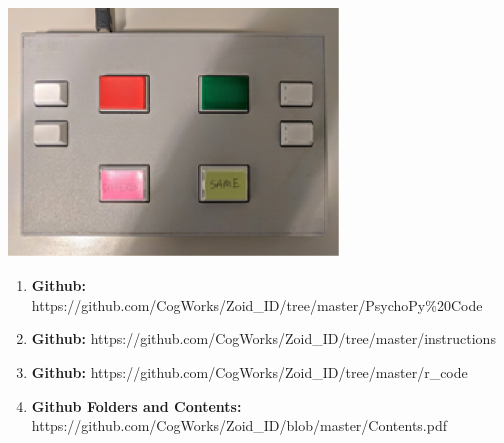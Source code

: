 \documentclass{article}
\begin{document}
	\noindent \textbf{\includegraphics*[width=3.46in, height=2.60in, keepaspectratio=false]{image25}}
	
	\begin{enumerate}
		\item \textbf{ Github: }https://github.com/CogWorks/Zoid\_ID/tree/master/PsychoPy\%20Code \textbf{ }
		
		\item \textbf{ Github: }https://github.com/CogWorks/Zoid\_ID/tree/master/instructions \textbf{ }
		
		\item \textbf{ Github: }https://github.com/CogWorks/Zoid\_ID/tree/master/r\_code \textbf{}
		
		\item \textbf{ Github Folders and Contents: }https://github.com/CogWorks/Zoid\_ID/blob/master/Contents.pdf\textbf{ }
	\end{enumerate}
	
	
\end{document}
